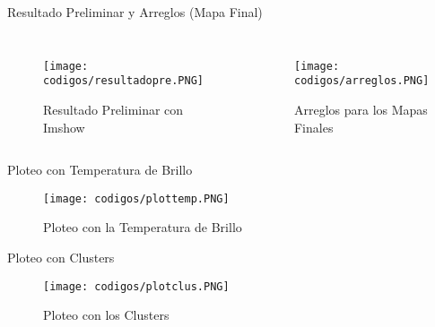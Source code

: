 \documentclass[aspectratio=169,xcolor=dvipsnames]{beamer}
\begin{document}
\begin{frame}{Resultado Preliminar y Arreglos (Mapa Final)}
    \begin{columns}

        \begin{figure}
            \centering
            \texttt{[image: codigos/resultadopre.PNG]}
            {\footnotesize %
            \caption{Resultado Preliminar con Imshow}
            \label{fig13}
            }
        \end{figure}
        \begin{figure}
            \centering
            \texttt{[image: codigos/arreglos.PNG]}
            {\footnotesize %
            \caption{Arreglos para los Mapas Finales}
            \label{fig14}
            }
        \end{figure}

    \end{columns}
\end{frame}
\begin{frame}{Ploteo con Temperatura de Brillo}
    \begin{figure}
        \centering
        \texttt{[image: codigos/plottemp.PNG]}
        {\footnotesize %
        \caption{Ploteo con la Temperatura de Brillo}
        \label{fig15}
        }
    \end{figure}
\end{frame}
\begin{frame}{Ploteo con Clusters}
    \begin{figure}
        \centering
        \texttt{[image: codigos/plotclus.PNG]}
        {\footnotesize %
        \caption{Ploteo con los Clusters}
        \label{fig16}
        }
    \end{figure}
\end{frame}
\end{document}
